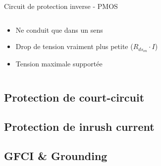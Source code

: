 \begin{frame}{Circuit de protection inverse - PMOS}
    \begin{columns}
        \begin{column}{0.33\textwidth}
            \begin{itemize}
                \item Ne conduit que dans un sens
                \bigskip
                \item Drop de tension vraiment plus petite ($R_{ds_{on}} \cdot I$)
                \bigskip
                \item Tension maximale supportée
            \end{itemize}
        \end{column}
        \begin{column}{0.66\textwidth}
            \begin{center}
            \vspace{-24pt}
            \end{center}
        \end{column}
    \end{columns}
\end{frame}

\subsection{Protection de court-circuit}
\subsection{Protection de inrush current}
\subsection{GFCI \& Grounding}